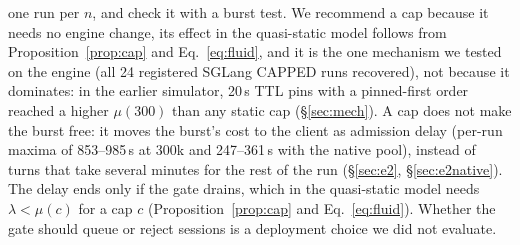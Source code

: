 one run per $n$, and check it with a burst test. We recommend a cap because it needs no engine change, its effect in the quasi-static model follows from Proposition~\ref{prop:cap} and Eq.~\eqref{eq:fluid}, and it is the one mechanism we tested on the engine (all 24 registered SGLang CAPPED runs recovered), not because it dominates: in the earlier simulator, 20\,s TTL pins with a pinned-first order reached a higher $\mu(300)$ than any static cap (\S\ref{sec:mech}). A cap does not make the burst free: it moves the burst's cost to the client as admission delay (per-run maxima of 853--985\,s at 300k and 247--361\,s with the native pool), instead of turns that take several minutes for the rest of the run (\S\ref{sec:e2}, \S\ref{sec:e2native}). The delay ends only if the gate drains, which in the quasi-static model needs $\lambda<\mu(c)$ for a cap $c$ (Proposition~\ref{prop:cap} and Eq.~\eqref{eq:fluid}). Whether the gate should queue or reject sessions is a deployment choice we did not evaluate.

